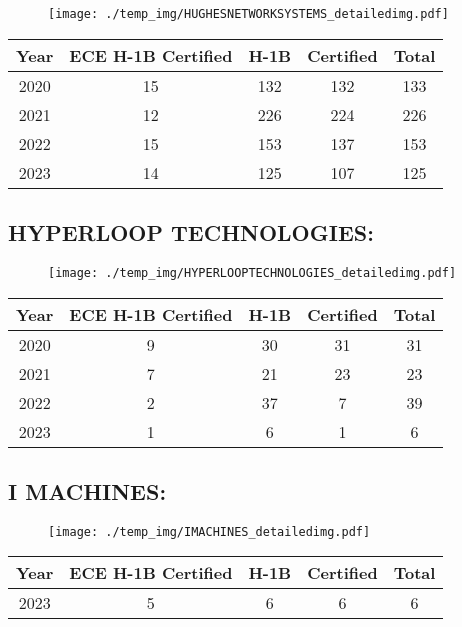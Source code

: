 \documentclass{article}%
\begin{document}
\begin{figure}[htbp]%
\centering%
\texttt{[image: ./temp\_img/HUGHESNETWORKSYSTEMS\_detailedimg.pdf]}%
\end{figure}

%
\begin{longtable}{c|c|c|c|c}%
\hline%
Year&ECE H{-}1B Certified&H{-}1B&Certified&Total\\%
\hline%
2020&15&132&132&133\\%
\hline%
2021&12&226&224&226\\%
\hline%
2022&15&153&137&153\\%
\hline%
2023&14&125&107&125\\%
\hline%
\end{longtable}

%
\newpage%
\subsection{HYPERLOOP TECHNOLOGIES:}%
\label{subsec:HYPERLOOPTECHNOLOGIES}%
\label{HYPERLOOPTECHNOLOGIESdetailed}%


\begin{figure}[htbp]%
\centering%
\texttt{[image: ./temp\_img/HYPERLOOPTECHNOLOGIES\_detailedimg.pdf]}%
\end{figure}

%
\begin{longtable}{c|c|c|c|c}%
\hline%
Year&ECE H{-}1B Certified&H{-}1B&Certified&Total\\%
\hline%
2020&9&30&31&31\\%
\hline%
2021&7&21&23&23\\%
\hline%
2022&2&37&7&39\\%
\hline%
2023&1&6&1&6\\%
\hline%
\end{longtable}

%
\newpage%
\subsection{I MACHINES:}%
\label{subsec:IMACHINES}%
\label{IMACHINESdetailed}%


\begin{figure}[htbp]%
\centering%
\texttt{[image: ./temp\_img/IMACHINES\_detailedimg.pdf]}%
\end{figure}

%
\begin{longtable}{c|c|c|c|c}%
\hline%
Year&ECE H{-}1B Certified&H{-}1B&Certified&Total\\%
\hline%
2023&5&6&6&6\\%
\hline%
\end{longtable}
\end{document}
